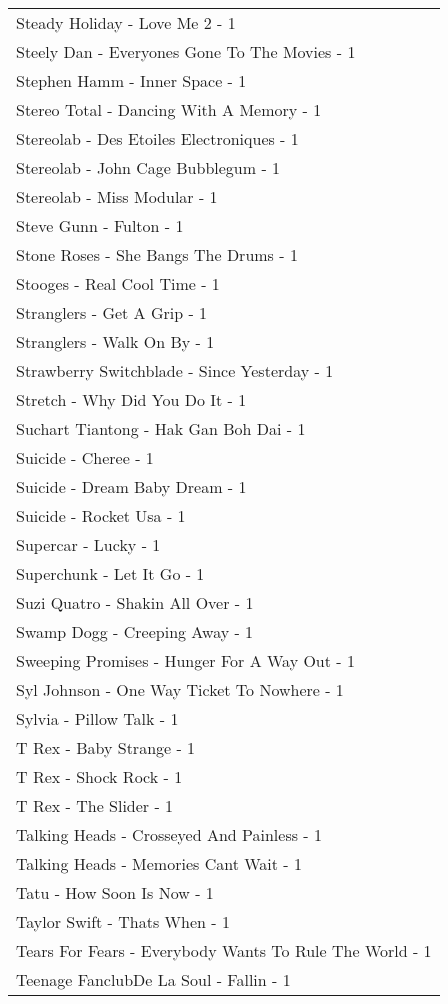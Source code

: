 \documentclass[
]{article}
\begin{document}
\begin{longtable}{l}
Steady Holiday - Love Me 2 - 1 \\ 
Steely Dan - Everyones Gone To The Movies - 1 \\ 
Stephen Hamm - Inner Space - 1 \\ 
Stereo Total - Dancing With A Memory - 1 \\ 
Stereolab - Des Etoiles Electroniques - 1 \\ 
Stereolab - John Cage Bubblegum - 1 \\ 
Stereolab - Miss Modular - 1 \\ 
Steve Gunn - Fulton - 1 \\ 
Stone Roses - She Bangs The Drums - 1 \\ 
Stooges - Real Cool Time - 1 \\ 
Stranglers - Get A Grip - 1 \\ 
Stranglers - Walk On By - 1 \\ 
Strawberry Switchblade - Since Yesterday - 1 \\ 
Stretch - Why Did You Do It - 1 \\ 
Suchart Tiantong - Hak Gan Boh Dai - 1 \\ 
Suicide - Cheree - 1 \\ 
Suicide - Dream Baby Dream - 1 \\ 
Suicide - Rocket Usa - 1 \\ 
Supercar - Lucky - 1 \\ 
Superchunk - Let It Go - 1 \\ 
Suzi Quatro - Shakin All Over - 1 \\ 
Swamp Dogg - Creeping Away - 1 \\ 
Sweeping Promises - Hunger For A Way Out - 1 \\ 
Syl Johnson - One Way Ticket To Nowhere - 1 \\ 
Sylvia - Pillow Talk - 1 \\ 
T Rex - Baby Strange - 1 \\ 
T Rex - Shock Rock - 1 \\ 
T Rex - The Slider - 1 \\ 
Talking Heads - Crosseyed And Painless - 1 \\ 
Talking Heads - Memories Cant Wait - 1 \\ 
Tatu - How Soon Is Now - 1 \\ 
Taylor Swift - Thats When - 1 \\ 
Tears For Fears - Everybody Wants To Rule The World - 1 \\ 
Teenage FanclubDe La Soul - Fallin - 1 \\ 

\end{longtable}
\end{document}
